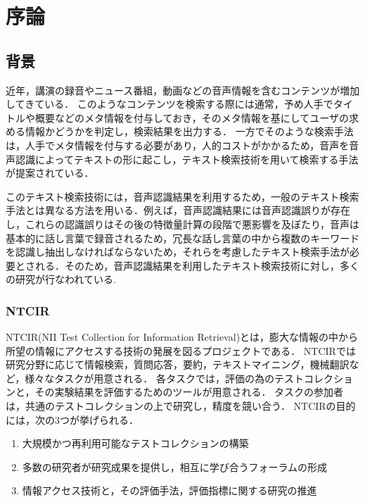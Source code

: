 ﻿%

\chapter{序論} %
\section{背景}
近年，講演の録音やニュース番組，動画などの音声情報を含むコンテンツが増加してきている．
このようなコンテンツを検索する際には通常，予め人手でタイトルや概要などのメタ情報を付与しておき，そのメタ情報を基にしてユーザの求める情報かどうかを判定し，検索結果を出力する．
一方でそのような検索手法は，人手でメタ情報を付与する必要があり，人的コストがかかるため，音声を音声認識によってテキストの形に起こし，テキスト検索技術を用いて検索する手法が提案されている．

このテキスト検索技術には，音声認識結果を利用するため，一般のテキスト検索手法とは異なる方法を用いる．例えば，音声認識結果には音声認識誤りが存在し，これらの認識誤りはその後の特徴量計算の段階で悪影響を及ぼたり，音声は基本的に話し言葉で録音されるため，冗長な話し言葉の中から複数のキーワードを認識し抽出しなければならないため，それらを考慮したテキスト検索手法が必要とされる．そのため，音声認識結果を利用したテキスト検索技術に対し，多くの研究が行なわれている. 

\subsection{NTCIR}
NTCIR(NII Test Collection for Information Retrieval)\cite{NTCIR}とは，膨大な情報の中から所望の情報にアクセスする技術の発展を図るプロジェクトである．
NTCIRでは研究分野に応じて情報検索，質問応答，要約，テキストマイニング，機械翻訳など，様々なタスクが用意される．
各タスクでは，評価の為のテストコレクションと，その実験結果を評価するためのツールが用意される．
タスクの参加者は，共通のテストコレクションの上で研究し，精度を競い合う．
NTCIRの目的には，次の3つが挙げられる．
\begin{enumerate}
    \item 大規模かつ再利用可能なテストコレクションの構築
    \item 多数の研究者が研究成果を提供し，相互に学び合うフォーラムの形成
    \item 情報アクセス技術と，その評価手法，評価指標に関する研究の推進
\end{enumerate}

